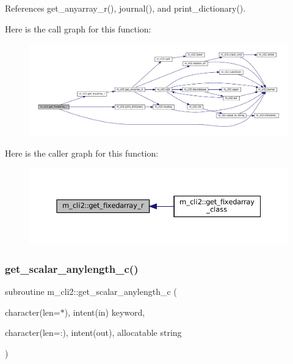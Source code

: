References get\+\_\+anyarray\+\_\+r(), journal(), and print\+\_\+dictionary().

Here is the call graph for this function\+:
\nopagebreak
\begin{figure}[H]
\begin{center}
\leavevmode
\includegraphics[width=350pt]{namespacem__cli2_afbec790abad0dca990c0a61cd2d9e9ae_cgraph}
\end{center}
\end{figure}
Here is the caller graph for this function\+:
\nopagebreak
\begin{figure}[H]
\begin{center}
\leavevmode
\includegraphics[width=350pt]{namespacem__cli2_afbec790abad0dca990c0a61cd2d9e9ae_icgraph}
\end{center}
\end{figure}
\mbox{\label{namespacem__cli2_a7429381c83a021ba3ffb32ed58e17a0e}} 
\subsubsection{\texorpdfstring{get\+\_\+scalar\+\_\+anylength\+\_\+c()}{get\_scalar\_anylength\_c()}}
{\footnotesize\ttfamily subroutine m\+\_\+cli2\+::get\+\_\+scalar\+\_\+anylength\+\_\+c (\begin{DoxyParamCaption}\item[{character(len=$\ast$), intent(in)}]{keyword,  }\item[{character(len=\+:), intent(out), allocatable}]{string }\end{DoxyParamCaption})\hspace{0.3cm}{\ttfamily [private]}}



